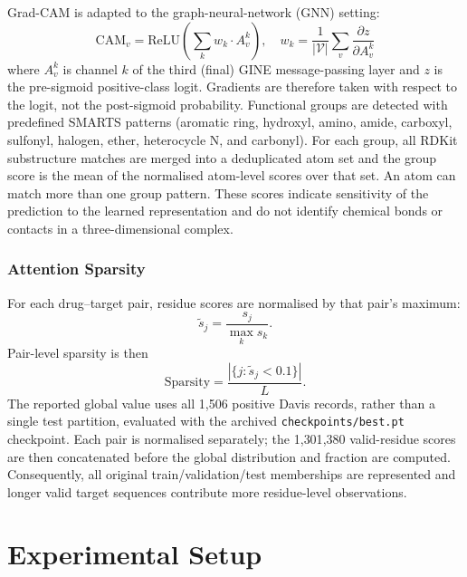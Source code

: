 \documentclass[fleqn,10pt]{wlscirep}
\begin{document}
Grad-CAM\cite{selvaraju2017grad} is adapted to the graph-neural-network (GNN)
setting:
\begin{equation}
\mathrm{CAM}_v = \mathrm{ReLU}\!\left(\sum_k w_k\cdot A_v^k\right),\quad
w_k = \frac{1}{|\mathcal{V}|}\sum_v\frac{\partial z}{\partial A_v^k}
\end{equation}
where $A_v^k$ is channel $k$ of the third (final) GINE message-passing layer
and $z$ is the pre-sigmoid positive-class logit. Gradients are therefore taken
with respect to the logit, not the post-sigmoid probability.
Functional groups are detected with predefined SMARTS patterns (aromatic ring,
hydroxyl, amino, amide, carboxyl, sulfonyl, halogen, ether, heterocycle N, and
carbonyl). For each group, all RDKit substructure matches are merged into a
deduplicated atom set and the group score is the mean of the normalised
atom-level scores over that set. An atom can match more than one group pattern.
These scores indicate sensitivity of the prediction to the learned
representation and do not identify chemical bonds or contacts in a
three-dimensional complex.

\subsubsection{Attention Sparsity}

For each drug--target pair, residue scores are normalised by that pair's maximum:
\begin{equation}
\widetilde{s}_j = \frac{s_j}{\max_k s_k}.
\end{equation}
Pair-level sparsity is then
\begin{equation}
\mathrm{Sparsity} = \frac{|\{j : \widetilde{s}_j < 0.1\}|}{L}.
\end{equation}
The reported global value uses all 1{,}506 positive Davis records, rather than a
single test partition, evaluated with the archived \texttt{checkpoints/best.pt}
checkpoint. Each pair is normalised separately; the 1{,}301{,}380 valid-residue
scores are then concatenated before the global distribution and fraction are
computed. Consequently, all original train/validation/test memberships are
represented and longer valid target sequences contribute more residue-level
observations.

\section{Experimental Setup}
\label{sec:experiments}
\end{document}
